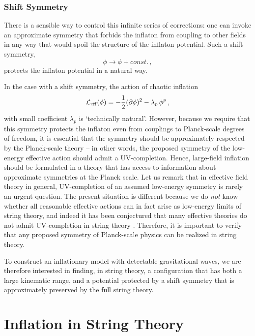 \documentclass[12pt,letterpaper,rotate]{article}
\def\beq{\begin{equation}}
\def\eeq{\end{equation}}
\begin{document}
{\subsubsection{Shift Symmetry}

There is a sensible way to control this infinite series of corrections: one can invoke an approximate symmetry that forbids the inflaton from coupling to other fields in any way that would spoil the structure of the inflaton potential.    Such a shift symmetry,
\begin{equation}
\phi \to \phi + const. \, ,
\end{equation}
protects the inflaton potential in a natural way.

In the case with a shift symmetry, the action of chaotic inflation \cite{Linde:1983gd}
 \beq
 {\cal L}_{\rm eff}(\phi) =- \frac{1}{2} (\partial \phi)^2 - \lambda_p\, \phi^p\, ,
 \eeq
with small coefficient $\lambda_p$ is `technically natural'. %
However, because we require that this symmetry protects the inflaton even from couplings to Planck-scale degrees of freedom, it is essential that the symmetry should be approximately respected by the Planck-scale theory -- in other words, the proposed symmetry of the low-energy effective action should admit a UV-completion.  Hence, large-field inflation should be formulated in a theory that has access to information about approximate symmetries at the Planck scale.  Let us remark that in effective field theory in general, UV-completion of an assumed low-energy symmetry is rarely an urgent question.  The present situation is different because we do {\it not} know whether all reasonable effective actions can in fact arise as low-energy limits of string theory, and indeed it has been conjectured that many effective theories do not admit UV-completion in string theory \cite{Vafa:2005ui,Ooguri:2006in, Adams:2006sv}.  Therefore, it is important to verify that any proposed symmetry of Planck-scale physics can be realized in string theory.

To construct  an inflationary model with detectable gravitational waves, we are therefore interested in finding, in string theory, a configuration that has both a large kinematic range, and a potential protected by a shift symmetry that is approximately preserved by the full string theory.




\section{Inflation in String Theory}
\label{sec:ST}

}
\end{document}
